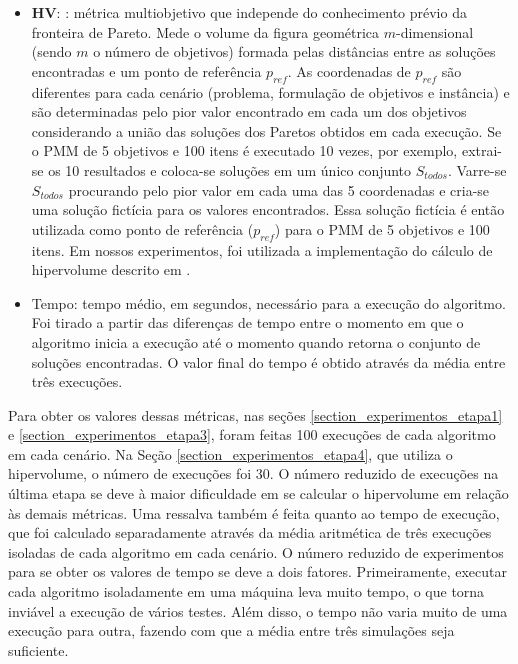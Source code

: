 \begin{itemize}
	\item \textbf{\ac{HV}}: \cite{Bradstreet2012}: métrica multiobjetivo que independe do conhecimento prévio da fronteira de Pareto. Mede o volume da figura geométrica $m$-dimensional (sendo $m$ o número de objetivos) formada pelas distâncias entre as soluções encontradas e um ponto de referência $p_{ref}$. As coordenadas de $p_{ref}$ são diferentes para cada cenário (problema, formulação de objetivos e instância) e são determinadas pelo pior valor encontrado em cada um dos objetivos considerando a união das soluções dos Paretos obtidos em cada execução. Se o PMM de 5 objetivos e 100 itens é executado 10 vezes, por exemplo, extrai-se os 10 resultados e coloca-se soluções em um único conjunto $S_{todos}$. Varre-se $S_{todos}$ procurando pelo pior valor em cada uma das 5 coordenadas e cria-se uma solução fictícia para os valores encontrados. Essa solução fictícia é então utilizada como ponto de referência ($p_{ref}$) para o PMM de 5 objetivos e 100 itens. Em nossos experimentos, foi utilizada a implementação do cálculo de hipervolume descrito em \cite{Bradstreet2012}.
	\item Tempo: tempo médio, em segundos, necessário para a execução do algoritmo. Foi tirado a partir das diferenças de tempo entre o momento em que o algoritmo inicia a execução até o momento quando retorna o conjunto de soluções encontradas. O valor final do tempo é obtido através da média entre três execuções.
\end{itemize}

Para obter os valores dessas métricas, nas seções \ref{section_experimentos_etapa1} e \ref{section_experimentos_etapa3}, foram feitas 100 execuções de cada algoritmo em cada cenário. Na Seção \ref{section_experimentos_etapa4}, que utiliza o hipervolume, o número de execuções foi 30. O número reduzido de execuções na última etapa se deve à maior dificuldade em se calcular o hipervolume em relação às demais métricas. Uma ressalva também é feita quanto ao tempo de execução, que foi calculado separadamente através da média aritmética de três execuções isoladas de cada algoritmo em cada cenário. O número reduzido de experimentos para se obter os valores de tempo se deve a dois fatores. Primeiramente, executar cada algoritmo isoladamente em uma máquina leva muito tempo, o que torna inviável a execução de vários testes. Além disso, o tempo não varia muito de uma execução para outra, fazendo com que a média entre três simulações seja suficiente. 

